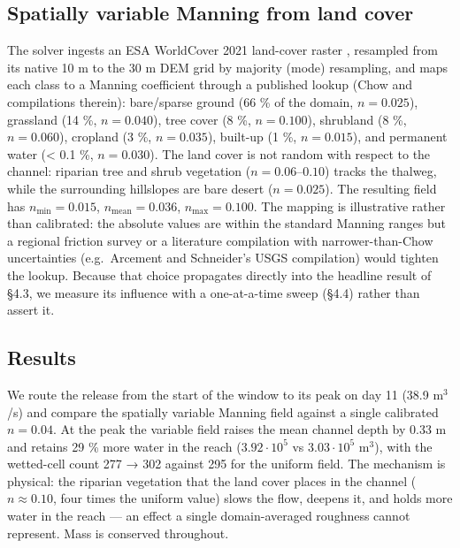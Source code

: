 \subsection{Spatially variable Manning from land
cover}

The solver ingests an ESA WorldCover 2021 land-cover raster
\citep{ESAWorldCover2021}, resampled from its native 10 m to the 30 m
DEM grid by majority (mode) resampling, and maps each class to a Manning
coefficient through a published lookup (Chow \citep{Chow1959} and
compilations therein): bare/sparse ground (66 \% of the domain,
\(n = 0.025\)), grassland (14 \%, \(n = 0.040\)), tree cover (8 \%,
\(n = 0.100\)), shrubland (8 \%, \(n = 0.060\)), cropland (3 \%,
\(n = 0.035\)), built-up (1 \%, \(n = 0.015\)), and permanent water
(\textless{} 0.1 \%, \(n = 0.030\)). The land cover is not random with
respect to the channel: riparian tree and shrub vegetation
(\(n = 0.06\)--\(0.10\)) tracks the thalweg, while the surrounding
hillslopes are bare desert (\(n = 0.025\)). The resulting field has
\(n_{\min} = 0.015\), \(n_{\text{mean}} = 0.036\), \(n_{\max} = 0.100\).
The mapping is illustrative rather than calibrated: the absolute values
are within the standard Manning ranges \citep{Chow1959} but a regional
friction survey or a literature compilation with narrower-than-Chow
uncertainties (e.g.~Arcement and Schneider's USGS compilation) would
tighten the lookup. Because that choice propagates directly into the
headline result of §4.3, we measure its influence with a one-at-a-time
sweep (§4.4) rather than assert it.

\subsection{Results}

We route the release from the start of the window to its peak on day 11
(38.9 m$^{3}$/s) and compare the spatially variable Manning field against a
single calibrated \(n = 0.04\). At the peak the variable field raises
the mean channel depth by 0.33 m and retains 29 \% more water in the
reach (\(3.92\cdot 10^{5}\) vs \(3.03\cdot 10^{5}\) m$^{3}$), with the
wetted-cell count 277 → 302 against 295 for the uniform field. The
mechanism is physical: the riparian vegetation that the land cover
places in the channel (\(n \approx 0.10\), four times the uniform value)
slows the flow, deepens it, and holds more water in the reach --- an
effect a single domain-averaged roughness cannot represent. Mass is
conserved throughout.

